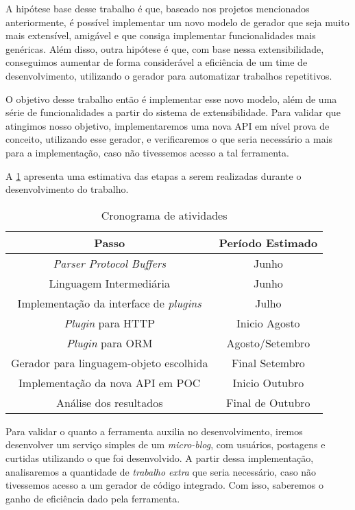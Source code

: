 A hipótese base desse trabalho é que, baseado nos projetos mencionados anteriormente,
é possível implementar um novo modelo de gerador que seja muito mais extensível, amigável
e que consiga implementar funcionalidades mais genéricas. Além disso, outra hipótese
é que, com base nessa extensibilidade, conseguimos aumentar de forma considerável a
eficiência de um time de desenvolvimento, utilizando o gerador para automatizar
trabalhos repetitivos.

O objetivo desse trabalho então é implementar esse novo modelo, além de uma série de
funcionalidades a partir do sistema de extensibilidade. Para validar que atingimos nosso
objetivo, implementaremos uma nova API em nível prova de conceito, utilizando esse gerador,
e verificaremos o que seria necessário a mais para a implementação, caso não tivessemos
acesso a tal ferramenta.

A \cref{tbl:cronograma} apresenta uma estimativa das etapas a serem realizadas durante
o desenvolvimento do trabalho.

\begin{table}[ht]
\centering
\begin{tabular}{c | c}
Passo & Período Estimado \\
\hline
\textit{Parser Protocol Buffers} & Junho \\
Linguagem Intermediária & Junho \\
Implementação da interface de \textit{plugins} & Julho \\
\textit{Plugin} para HTTP & Inicio Agosto \\
\textit{Plugin} para ORM & Agosto/Setembro \\
Gerador para linguagem-objeto escolhida & Final Setembro \\
Implementação da nova API em POC & Inicio Outubro \\
Análise dos resultados & Final de Outubro
\end{tabular}
\caption{Cronograma de atividades}
\label{tbl:cronograma}
\end{table}

Para validar o quanto a ferramenta auxilia no desenvolvimento, iremos desenvolver um
serviço simples de um \textit{micro-blog}, com usuários, postagens e curtidas utilizando
o que foi desenvolvido. A partir dessa implementação, analisaremos a quantidade de
\textit{trabalho extra} que seria necessário, caso não tivessemos acesso a um gerador
de código integrado. Com isso, saberemos o ganho de eficiência dado pela ferramenta.

